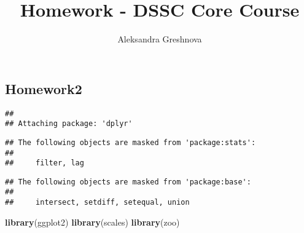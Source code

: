 \documentclass[]{article}
\title{Homework - DSSC Core Course}
\author{Aleksandra Greshnova}
\date{}
\newenvironment{Shaded}{\begin{snugshade}}{\end{snugshade}}
\newcommand{\KeywordTok}[1]{\textcolor[rgb]{0.13,0.29,0.53}{\textbf{#1}}}
\newcommand{\DataTypeTok}[1]{\textcolor[rgb]{0.13,0.29,0.53}{#1}}
\newcommand{\DecValTok}[1]{\textcolor[rgb]{0.00,0.00,0.81}{#1}}
\newcommand{\StringTok}[1]{\textcolor[rgb]{0.31,0.60,0.02}{#1}}
\newcommand{\CommentTok}[1]{\textcolor[rgb]{0.56,0.35,0.01}{\textit{#1}}}
\newcommand{\OperatorTok}[1]{\textcolor[rgb]{0.81,0.36,0.00}{\textbf{#1}}}
\newcommand{\NormalTok}[1]{#1}
\begin{document}
\maketitle

\subsection{Homework2}\label{homework2}

\begin{Shaded}
\end{Shaded}

\begin{verbatim}
## 
## Attaching package: 'dplyr'
\end{verbatim}

\begin{verbatim}
## The following objects are masked from 'package:stats':
## 
##     filter, lag
\end{verbatim}

\begin{verbatim}
## The following objects are masked from 'package:base':
## 
##     intersect, setdiff, setequal, union
\end{verbatim}

\begin{Shaded}
\begin{Highlighting}[]
\KeywordTok{library}\NormalTok{(ggplot2)}
\KeywordTok{library}\NormalTok{(scales)}
\KeywordTok{library}\NormalTok{(zoo)}
\end{Highlighting}
\end{Shaded}
\end{document}
